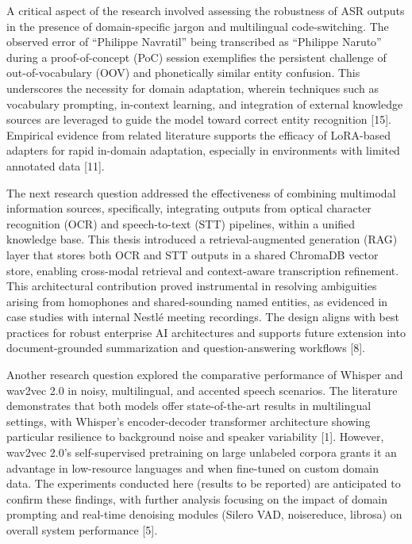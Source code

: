 \documentclass[12pt,a4paper]{article}
\begin{document}
A critical aspect of the research involved assessing the robustness of ASR outputs in the presence of domain-specific jargon and multilingual code-switching. The observed error of “Philippe Navratil” being transcribed as “Philippe Naruto” during a proof-of-concept (PoC) session exemplifies the persistent challenge of out-of-vocabulary (OOV) and phonetically similar entity confusion. This underscores the necessity for domain adaptation, wherein techniques such as vocabulary prompting, in-context learning, and integration of external knowledge sources are leveraged to guide the model toward correct entity recognition [15]. Empirical evidence from related literature supports the efficacy of LoRA-based adapters for rapid in-domain adaptation, especially in environments with limited annotated data [11].


The next research question addressed the effectiveness of combining multimodal information sources, specifically, integrating outputs from optical character recognition (OCR) and speech-to-text (STT) pipelines, within a unified knowledge base. This thesis introduced a retrieval-augmented generation (RAG) layer that stores both OCR and STT outputs in a shared ChromaDB vector store, enabling cross-modal retrieval and context-aware transcription refinement. This architectural contribution proved instrumental in resolving ambiguities arising from homophones and shared-sounding named entities, as evidenced in case studies with internal Nestlé meeting recordings. The design aligns with best practices for robust enterprise AI architectures and supports future extension into document-grounded summarization and question-answering workflows [8].


Another research question explored the comparative performance of Whisper and wav2vec 2.0 in noisy, multilingual, and accented speech scenarios. The literature demonstrates that both models offer state-of-the-art results in multilingual settings, with Whisper’s encoder-decoder transformer architecture showing particular resilience to background noise and speaker variability [1]. However, wav2vec 2.0’s self-supervised pretraining on large unlabeled corpora grants it an advantage in low-resource languages and when fine-tuned on custom domain data. The experiments conducted here (results to be reported) are anticipated to confirm these findings, with further analysis focusing on the impact of domain prompting and real-time denoising modules (Silero VAD, noisereduce, librosa) on overall system performance [5].
\end{document}

